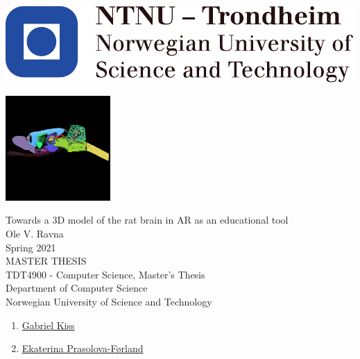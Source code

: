 
\thispagestyle{empty}
\includegraphics[scale=1.1]{fig/NTNU}
\mbox{}\\[3pc]
\begin{center}

\includegraphics[width=0.3\textwidth]{fig/nevrolens_icon}

\Huge{Towards a 3D model of the rat brain in AR as an educational tool}\\[2pc]

\Large{Ole V. Ravna}\\[1pc]
\large{Spring 2021}\\[2pc]

MASTER THESIS\\
TDT4900 - Computer Science, Master's Thesis\\
Department of Computer Science\\
Norwegian University of Science and Technology
\end{center}
\vfill


\begin{enumerate}[label={Supervisor \arabic*:}]
    \item \href{https://www.ntnu.no/ansatte/gabriel.kiss}{Gabriel Kiss}
    \item \href{https://www.ntnu.no/ansatte/ekaterip}{Ekaterina Prasolova-Førland}
\end{enumerate}


